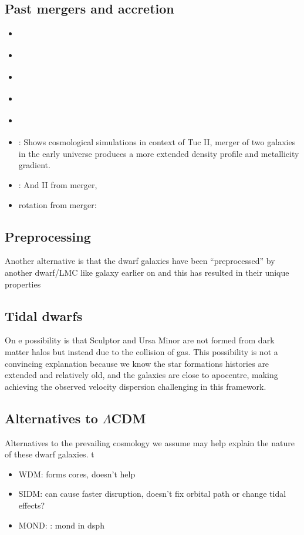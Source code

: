 \subsection{Past mergers and
accretion}\label{past-mergers-and-accretion}

\begin{itemize}
\tightlist
\item
  \citet{deason+2014}
\item
  \citet{deason+2022}
\item
  \citet{ricotti+2022}
\item
  \citet{querci+2025}
\item
  \citet{amorisco+evans+vandeven2014}
\item
  \citet{tarumi+yoshida+frebel2021}: Shows cosmological simulations in
  context of Tuc II, merger of two galaxies in the early universe
  produces a more extended density profile and metallicity gradient.
\item
  \citet{lokas+2014}: And II from merger,
\item
  rotation from merger: \citet{cardona-barrero+2021}
\end{itemize}

\subsection{Preprocessing}\label{preprocessing}

Another alternative is that the dwarf galaxies have been
``preprocessed'' by another dwarf/LMC like galaxy earlier on and this
has resulted in their unique properties

\subsection{Tidal dwarfs}\label{tidal-dwarfs}

On e possibility is that Sculptor and Ursa Minor are not formed from
dark matter halos but instead due to the collision of gas. This
possibility is not a convincing explanation because we know the star
formations histories are extended and relatively old, and the galaxies
are close to apocentre, making achieving the observed velocity
dispersion challenging in this framework.

\subsection{\texorpdfstring{Alternatives to
\(\Lambda\)CDM}{Alternatives to \textbackslash LambdaCDM}}\label{alternatives-to-lambdacdm}

Alternatives to the prevailing cosmology we assume may help explain the
nature of these dwarf galaxies. t

\begin{itemize}
\tightlist
\item
  WDM: forms cores, doesn't help
\item
  SIDM: can cause faster disruption, doesn't fix orbital path or change
  tidal effects?
\item
  MOND: \citet{sanchez-salcedo+hernandez2007}: mond in dsph
\end{itemize}
